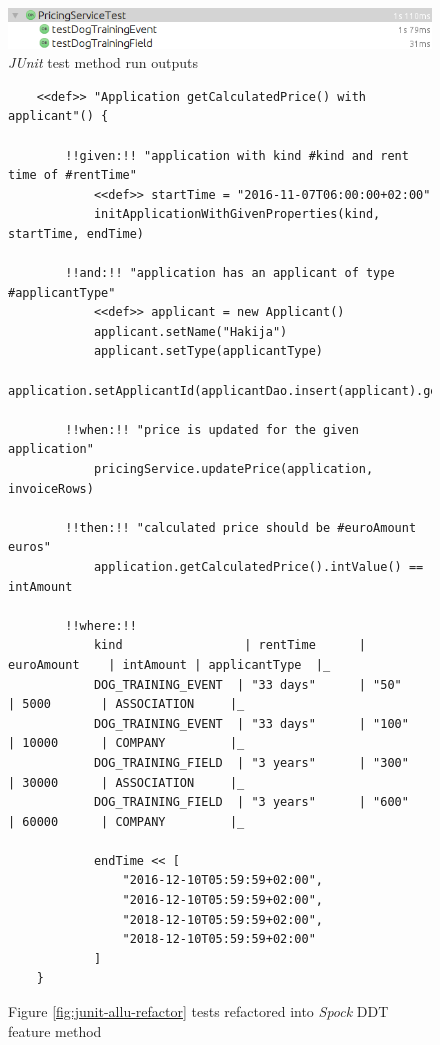     \begin{figure}[H]
      \begin{center}
        \begin{topbot}[style=mdstyle]
        \includegraphics[width=\textwidth]{images/junit-pricing-results.png}
        \end{topbot}
        \caption{\textit{JUnit} test method run outputs}
        \label{fig:junit-allu-refactor-output}
      \end{center}
    \end{figure}

    \begin{figure}[H]
        \begin{lstlisting}[style=java]
    %%@Unroll%%("getCalculatedPrice() with kind of #kind, rental time of #rentTime and applicant is #applicantType should amount to #euroAmount euros")
    <<def>> "Application getCalculatedPrice() with applicant"() {

        !!given:!! "application with kind #kind and rent time of #rentTime"
            <<def>> startTime = "2016-11-07T06:00:00+02:00"
            initApplicationWithGivenProperties(kind, startTime, endTime)

        !!and:!! "application has an applicant of type #applicantType"
            <<def>> applicant = new Applicant()
            applicant.setName("Hakija")
            applicant.setType(applicantType)
            application.setApplicantId(applicantDao.insert(applicant).getId())

        !!when:!! "price is updated for the given application"
            pricingService.updatePrice(application, invoiceRows)

        !!then:!! "calculated price should be #euroAmount euros"
            application.getCalculatedPrice().intValue() == intAmount

        !!where:!!
            kind                 | rentTime      | euroAmount    | intAmount | applicantType  |_
            DOG_TRAINING_EVENT  | "33 days"      | "50"          | 5000       | ASSOCIATION     |_
            DOG_TRAINING_EVENT  | "33 days"      | "100"         | 10000      | COMPANY         |_
            DOG_TRAINING_FIELD  | "3 years"      | "300"         | 30000      | ASSOCIATION     |_
            DOG_TRAINING_FIELD  | "3 years"      | "600"         | 60000      | COMPANY         |_

            endTime << [
                "2016-12-10T05:59:59+02:00",
                "2016-12-10T05:59:59+02:00",
                "2018-12-10T05:59:59+02:00",
                "2018-12-10T05:59:59+02:00"
            ]
    }
        \end{lstlisting}
        \caption{Figure \ref{fig:junit-allu-refactor} tests refactored into \textit{Spock} DDT feature method}
        \label{fig:spock-allu-refactor}

    \end{figure}

